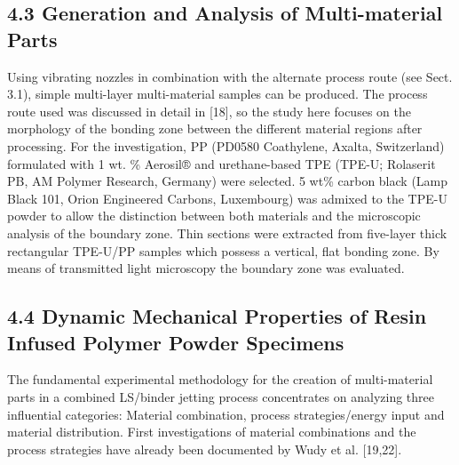 \documentclass[10pt]{article}
\begin{document}
\subsection*{4.3 Generation and Analysis of Multi-material Parts}
Using vibrating nozzles in combination with the alternate process route (see Sect. 3.1), simple multi-layer multi-material samples can be produced. The process route used was discussed in detail in [18], so the study here focuses on the morphology of the bonding zone between the different material regions after processing. For the investigation, PP (PD0580 Coathylene, Axalta, Switzerland) formulated with 1 wt. \% Aerosil® and urethane-based TPE (TPE-U; Rolaserit PB, AM Polymer Research, Germany) were selected. 5 wt\% carbon black (Lamp Black 101, Orion Engineered Carbons, Luxembourg) was admixed to the TPE-U powder to allow the distinction between both materials and the microscopic analysis of the boundary zone. Thin sections were extracted from five-layer thick rectangular TPE-U/PP samples which possess a vertical, flat bonding zone. By means of transmitted light microscopy the boundary zone was evaluated.

\subsection*{4.4 Dynamic Mechanical Properties of Resin Infused Polymer Powder Specimens}
The fundamental experimental methodology for the creation of multi-material parts in a combined LS/binder jetting process concentrates on analyzing three influential categories: Material combination, process strategies/energy input and material distribution. First investigations of material combinations and the process strategies have already been documented by Wudy et al. [19,22].
\end{document}

